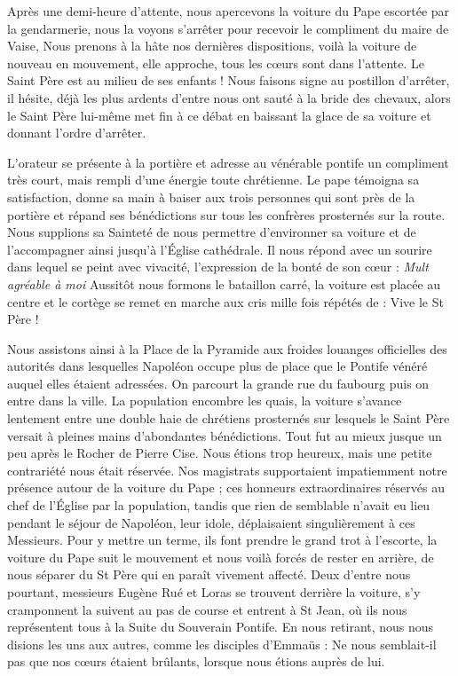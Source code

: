 \documentclass[11pt,a4paper]{report}
\begin{document}
Après une demi-heure d'attente, nous apercevons la voiture du Pape escortée par la gendarmerie, nous la voyons s'arrêter pour recevoir le compliment du maire de Vaise, Nous prenons à la hâte nos dernières dispositions, voilà la voiture de nouveau en mouvement, elle approche, tous les cœurs sont dans l'attente. Le Saint Père est au milieu de ses enfants ! Nous faisons signe au postillon d'arrêter, il hésite, déjà les plus ardents d'entre nous ont sauté à la bride des chevaux, alors le Saint Père lui-même met fin à ce débat en baissant la glace de sa voiture et donnant l'ordre d'arrêter.

L'orateur se présente à la portière et adresse au vénérable pontife un compliment très court, mais rempli d'une énergie toute chrétienne. Le pape témoigna sa satisfaction, donne sa main à baiser aux trois personnes qui sont près de la portière et répand ses bénédictions sur tous les confrères prosternés sur la route. Nous supplions sa Sainteté de nous permettre d'environner sa voiture et de l'accompagner ainsi jusqu'à l'Église cathédrale. Il nous répond avec un sourire dans lequel se peint avec vivacité, l'expression de la bonté de son cœur : \textit{Mult agréable à moi} Aussitôt nous formons le bataillon carré, la voiture est placée au centre et le cortège se remet en marche aux cris mille fois répétés de : Vive le St Père !

Nous assistons ainsi à la Place de la Pyramide aux froides louanges officielles des autorités dans lesquelles Napoléon occupe plus de place que le Pontife vénéré auquel elles étaient adressées. On parcourt la grande rue du faubourg puis on entre dans la ville. La population encombre les quais, la voiture s'avance lentement entre une double haie de chrétiens prosternés sur lesquels le Saint Père versait à pleines mains d'abondantes bénédictions. Tout fut au mieux jusque un peu après le Rocher de Pierre Cise. Nous étions trop heureux, mais une petite contrariété nous était réservée. Nos magistrats supportaient impatiemment notre présence autour de la voiture du Pape ; ces honneurs extraordinaires réservés au chef de l'Église par la population, tandis que rien de semblable n'avait eu lieu pendant le séjour de Napoléon, leur idole, déplaisaient singulièrement à ces Messieurs. Pour y mettre un terme, ils font prendre le grand trot à l'escorte, la voiture du Pape suit le mouvement et nous voilà forcés de rester en arrière, de nous séparer du St Père qui en paraît vivement affecté. Deux d'entre nous pourtant, messieurs Eugène Rué et Loras se trouvent derrière la voiture, s'y cramponnent la suivent au pas de course et entrent à St Jean, où ils nous représentent tous à la Suite du Souverain Pontife. En nous retirant, nous nous disions les uns aux autres, comme les disciples d'Emmaüs : Ne nous semblait-il pas que nos cœurs étaient brûlants, lorsque nous étions auprès de lui.
\end{document}
